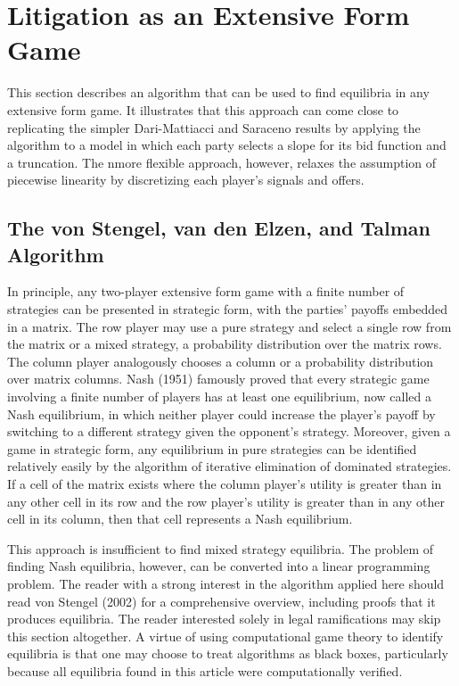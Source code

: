 \documentclass{article}
\begin{document}
\section{Litigation as an Extensive Form Game}

This section describes an algorithm that can be used to find equilibria in any extensive form game. It illustrates that this approach can come close to replicating the simpler Dari-Mattiacci and Saraceno results by applying the algorithm to a model in which each party selects a slope for its bid function and a truncation. The nmore flexible approach, however, relaxes the assumption of piecewise linearity by discretizing each player's signals and offers. 

\subsection{The von Stengel, van den Elzen, and Talman Algorithm}

In principle, any two-player extensive form game with a finite number of strategies can be presented in strategic form, with the parties' payoffs embedded in a matrix. The row player may use a pure strategy and select a single row from the matrix or a mixed strategy, a probability distribution over the matrix rows. The column player analogously chooses a column or a probability distribution over matrix columns. Nash (1951) famously proved that every strategic game involving a finite number of players has at least one equilibrium, now called a Nash equilibrium, in which neither player could increase the player's payoff by switching to a different strategy given the opponent's strategy. Moreover, given a game in strategic form, any equilibrium in pure strategies can be identified relatively easily by the algorithm of iterative elimination of dominated strategies. If a cell of the matrix exists where the column player's utility is greater than in any other cell in its row and the row player's utility is greater than in any other cell in its column, then that cell represents a Nash equilibrium. 

This approach is insufficient to find mixed strategy equilibria. The problem of finding Nash equilibria, however, can be converted into a linear programming problem. The reader with a strong interest in the algorithm applied here should read von Stengel (2002) for a comprehensive overview, including proofs that it produces equilibria. The reader interested solely in legal ramifications may skip this section altogether. A virtue of using computational game theory to identify equilibria is that one may choose to treat algorithms as black boxes, particularly because all equilibria found in this article were computationally verified.
\end{document}
